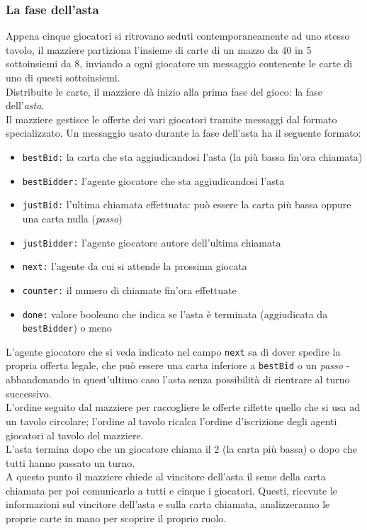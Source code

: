 \documentclass[runningheads,a4paper]{llncs}
\begin{document}
\subsubsection{La fase dell'asta}
Appena cinque giocatori si ritrovano seduti contemporaneamente ad uno stesso tavolo, il mazziere partiziona l'insieme di carte di un mazzo da 40 in 5 sottoinsiemi da 8, inviando a ogni giocatore un messaggio contenente le carte di uno di questi sottoinsiemi.\\
Distribuite le carte, il mazziere dà inizio alla prima fase del gioco: la fase dell'\emph{asta}.\\
Il mazziere gestisce le offerte dei vari giocatori tramite messaggi dal formato specializzato. 
Un messaggio usato durante la fase dell'asta ha il seguente formato:
\begin{itemize}
   \item \texttt{bestBid:}  la carta che sta aggiudicandosi l'asta (la più bassa fin'ora chiamata)
   \item \texttt{bestBidder:} l'agente giocatore che sta aggiudicandosi l'asta
   \item \texttt{justBid:}  l'ultima chiamata effettuata: può essere la carta più bassa oppure una carta nulla (\emph{passo})
   \item \texttt{justBidder:} l'agente giocatore autore dell'ultima chiamata
   \item \texttt{next:}  l'agente da cui si attende la prossima giocata
   \item \texttt{counter:}  il numero di chiamate fin'ora effettuate
   \item \texttt{done:}  valore booleano che indica se l'asta è terminata (aggiudicata da \texttt{bestBidder}) o meno
\end{itemize}
L'agente giocatore che si veda indicato nel campo \texttt{next} sa di dover spedire la propria offerta legale, che può essere una carta inferiore a \texttt{bestBid} o un \emph{passo} - abbandonando in quest'ultimo caso l'asta senza possibilità di rientrare al turno successivo.\\
L'ordine seguito dal mazziere per raccogliere le offerte riflette quello che si usa ad un tavolo circolare; l'ordine al tavolo ricalca l'ordine d'iscrizione degli agenti giocatori al tavolo del mazziere.\\
L'asta termina dopo che un giocatore chiama il 2 (la carta più bassa) o dopo che tutti hanno passato un turno.\\
A questo punto il mazziere chiede al vincitore dell'asta il seme della carta chiamata per poi comunicarlo a tutti e cinque i giocatori.
Questi, ricevute le informazioni sul vincitore dell'asta e sulla carta chiamata, analizzeranno le proprie carte in mano per scoprire il proprio ruolo.
\end{document}
